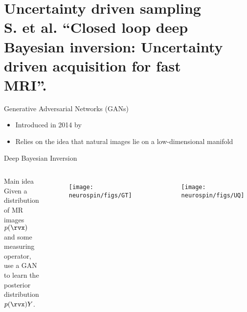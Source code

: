 \section{Uncertainty driven sampling\\[-3mm]{\footnotesize S. et al. ``Closed loop deep Bayesian inversion: Uncertainty driven acquisition for fast\\[-6mm] MRI''.}}

\begin{frame}[t]{Generative Adversarial Networks (GANs)}
\begin{itemize}
\item Introduced in 2014 by \cite{goodfellow2014generative}
\item Relies on the idea that natural images lie on a low-dimensional manifold
\end{itemize}



\end{frame}

\begin{frame}{Deep Bayesian Inversion \parencite{adler2018deep}}
\begin{columns}
\begin{block}{Main idea}
 Given a distribution of MR images $p(\rvx)$ and some measuring operator, use a GAN to learn the posterior distribution $p(\rvx)Y$.
\end{block}

\begin{figure}[!ht]
\hspace{-1.3cm}\texttt{[image: neurospin/figs/GT]}
\end{figure}
\vspace{-.3cm}

\begin{figure}[!ht]
\centering
\texttt{[image: neurospin/figs/UQ]}
\end{figure}
\end{columns}
	
\end{frame}


